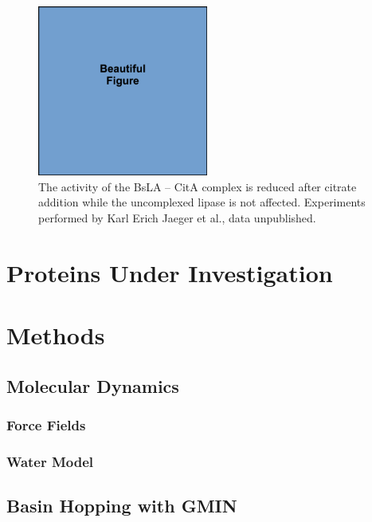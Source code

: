 \documentclass[english, a4paper, 12pt, titlepage, draft]{article}
\begin{document}
\begin{figure}
    \centering
    \includegraphics[width=0.5\textwidth]{figures/draft/draft.pdf}
    \caption{The activity of the BsLA -- CitA complex is reduced after citrate addition while the uncomplexed lipase is not affected. Experiments performed by Karl Erich Jaeger et al., data unpublished.}
    \label{fig:BsLAactivity}
\end{figure}



\section{Proteins Under Investigation}



\section{Methods}
\subsection{Molecular Dynamics}
\subsubsection{Force Fields}
\subsubsection{Water Model}
\subsection{Basin Hopping with GMIN}


\end{document}
